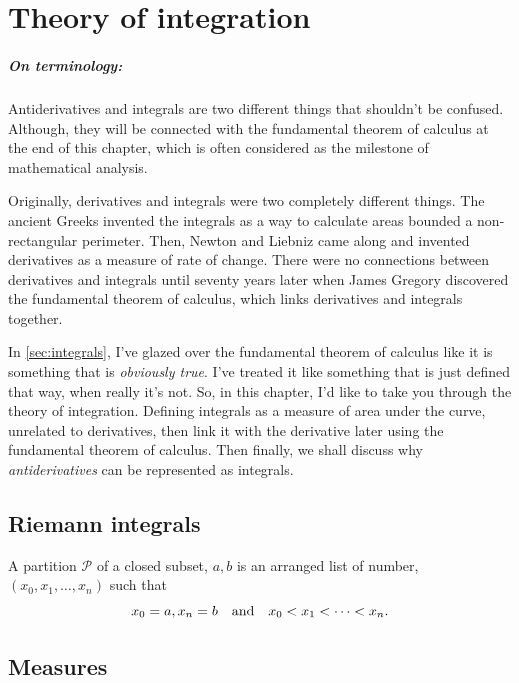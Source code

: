 \chapter{Theory of integration}

\paragraph{On terminology:} Antiderivatives and integrals are two different things that shouldn't be confused. Although, they will be connected with the fundamental theorem of calculus at the end of this chapter, which is often considered as the milestone of mathematical analysis.

Originally, derivatives and integrals were two completely different things. The ancient Greeks invented the integrals as a way to calculate areas bounded a non-rectangular perimeter. Then, Newton and Liebniz came along and invented derivatives as a measure of rate of change. There were no connections between derivatives and integrals until seventy years later when James Gregory discovered the fundamental theorem of calculus, which links derivatives and integrals together.

In \cref{sec:integrals}, I've glazed over the fundamental theorem of calculus like it is something that is \emph{obviously true}. I've treated it like something that is just defined that way, when really it's not. So, in this chapter, I'd like to take you through the theory of integration. Defining integrals as a measure of area under the curve, unrelated to derivatives, then link it with the derivative later using the fundamental theorem of calculus. Then finally, we shall discuss why \emph{antiderivatives} can be represented as integrals.

\section{Riemann integrals}

A partition \(\mathcal{P}\) of a closed subset, \({a, b}\) is an arranged list of number, \((x_0, x_1, \dots, x_n)\) such that
\begin{equation}
  x_0 = a, x_n = b \quad\textrm{and}\quad x_0 < x_1 < \dots < x_n.
\end{equation}

\section{Measures}
